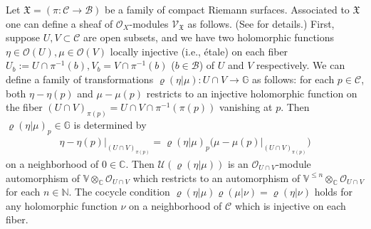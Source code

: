 \documentclass[12pt,a4paper,notitlepage]{article}
\theoremstyle{definition}
\theoremstyle{plain}
\newcommand{\fk}{\mathfrak}
\newcommand{\mc}{\mathcal}
\newcommand{\scr}{\mathscr}
\newcommand{\Vbb}{\mathbb V}
\newcommand{\Gbb}{\mathbb G}
\newcommand{\Cbb}{\mathbb C}
\newcommand{\Nbb}{\mathbb N}
\numberwithin{equation}{section}
\begin{document}
Let $\fk X=(\pi:\mc C\rightarrow\mc B)$ be a family of compact Riemann surfaces. Associated to $\fk X$ one can define a sheaf of $\scr O_X$-modules $\scr V_{\fk X}$ as follows. (See \cite[Sec. 5]{Gui20} for details.) First, suppose $U,V\subset\mc C$ are open subsets, and we have two holomorphic functions $\eta\in\scr O(U),\mu\in\scr O(V)$ locally injective (i.e., \'etale) on  each fiber $U_b:=U\cap\pi^{-1}(b),V_b=V\cap\pi^{-1}(b)$ ($b\in\mc B$) of $U$ and $V$ respectively. We can define a family of transformations $\varrho(\eta|\mu):U\cap V\rightarrow\Gbb$  as follows: for each $p\in\mc C$, both $\eta-\eta(p)$ and $\mu-\mu(p)$ restricts to an injective holomorphic function on the fiber $(U\cap V)_{\pi(p)}=U\cap V\cap\pi^{-1}(\pi(p))$ vanishing at $p$. Then $\varrho(\eta|\mu)_p\in\Gbb$ is determined by 
\begin{align}
\boxed{~\eta-\eta(p)\big|_{(U\cap V)_{\pi(p)}}	=\varrho(\eta|\mu)_p\big(\mu-\mu(p)\big|_{(U\cap V)_{\pi(p)}}\big)~}\label{eq10}
\end{align}
on a neighborhood of $0\in\Cbb$. Then $\mc U(\varrho(\eta|\mu))$ is an $\scr O_{U\cap V}$-module automorphism of $\Vbb\otimes_\Cbb\scr O_{U\cap V}$ which restricts to an automorphism of $\Vbb^{\leq n}\otimes_\Cbb\scr O_{U\cap V}$ for each $n\in\Nbb$. The cocycle condition $\varrho(\eta|\mu)\varrho(\mu|\nu)=\varrho(\eta|\nu)$ holds for any holomorphic function $\nu$ on a neighborhood of $\mc C$ which is injective on each fiber. 
\end{document}
